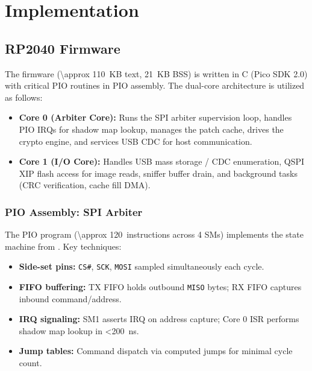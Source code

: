 \section{Implementation}
\label{sec:implementation}

\subsection{RP2040 Firmware}
The \vbfc firmware (\SI{\approx 110}{KB} text, \SI{21}{KB} BSS) is written in C (Pico SDK 2.0) with critical \ac{PIO} routines in \ac{PIO} assembly. The dual-core architecture is utilized as follows:

\begin{itemize}
    \item \textbf{Core 0 (Arbiter Core):} Runs the \ac{SPI} arbiter supervision loop, handles \ac{PIO} IRQs for shadow map lookup, manages the patch cache, drives the crypto engine, and services USB CDC for host communication.
    \item \textbf{Core 1 (I/O Core):} Handles USB mass storage / CDC enumeration, \ac{QSPI} XIP flash access for image reads, sniffer buffer drain, and background tasks (CRC verification, cache fill DMA).
\end{itemize}

\subsubsection{PIO Assembly: SPI Arbiter}
The \ac{PIO} program (\SI{\approx 120}{instructions} across 4 SMs) implements the state machine from . Key techniques:
\begin{itemize}
    \item \textbf{Side-set pins:} \texttt{CS\#}, \texttt{SCK}, \texttt{MOSI} sampled simultaneously each cycle.
    \item \textbf{FIFO buffering:} TX FIFO holds outbound \texttt{MISO} bytes; RX FIFO captures inbound command/address.
    \item \textbf{IRQ signaling:} SM1 asserts IRQ on address capture; Core 0 ISR performs shadow map lookup in \SI{<200}{ns}.
    \item \textbf{Jump tables:} Command dispatch via computed jumps for minimal cycle count.
\end{itemize}


